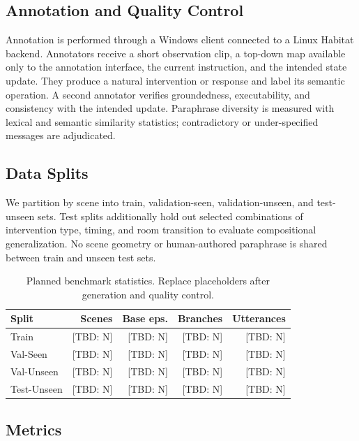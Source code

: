 \documentclass[10pt]{article}
\newcommand{\tbd}[1]{\textcolor{red!75!black}{[TBD: #1]}}
\begin{document}
\subsection{Annotation and Quality Control}

Annotation is performed through a Windows client connected to a Linux Habitat
backend. Annotators receive a short observation clip, a top-down map available
only to the annotation interface, the current instruction, and the intended
state update. They produce a natural intervention or response and label its
semantic operation. A second annotator verifies groundedness, executability,
and consistency with the intended update. Paraphrase diversity is measured
with lexical and semantic similarity statistics; contradictory or
under-specified messages are adjudicated.

\subsection{Data Splits}

We partition by scene into train, validation-seen, validation-unseen, and
test-unseen sets. Test splits additionally hold out selected combinations of
intervention type, timing, and room transition to evaluate compositional
generalization. No scene geometry or human-authored paraphrase is shared
between train and unseen test sets.

\begin{table}[t]
\centering
\small
\begin{tabular}{lrrrr}
\toprule
\textbf{Split} & \textbf{Scenes} & \textbf{Base eps.} &
\textbf{Branches} & \textbf{Utterances}\\
\midrule
Train & \tbd{N} & \tbd{N} & \tbd{N} & \tbd{N}\\
Val-Seen & \tbd{N} & \tbd{N} & \tbd{N} & \tbd{N}\\
Val-Unseen & \tbd{N} & \tbd{N} & \tbd{N} & \tbd{N}\\
Test-Unseen & \tbd{N} & \tbd{N} & \tbd{N} & \tbd{N}\\
\bottomrule
\end{tabular}
\caption{Planned benchmark statistics. Replace placeholders after generation
and quality control.}
\label{tab:data}
\end{table}

\subsection{Metrics}
\end{document}
